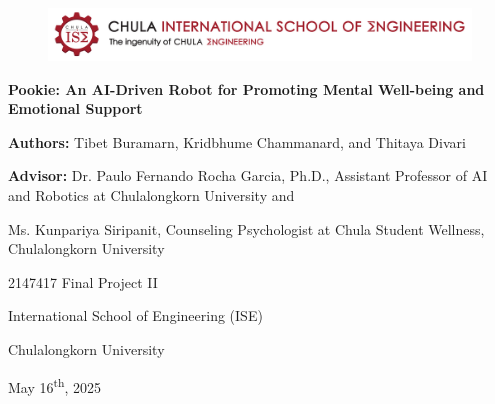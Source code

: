 \documentclass[a4paper,10pt]{article}
\begin{document}
\begin{titlepage}
    \centering  
    \begin{figure}[ht]
        \centering
        \includegraphics[width=\textwidth]{0-ise-logo.png}
    \end{figure}
    \vspace*{2cm} 
    
    {\Huge \textbf{Pookie: An AI-Driven Robot for Promoting Mental Well-being and Emotional Support} \par}
    \vspace{4cm}
    
    {\large \textbf{Authors:} Tibet Buramarn, Kridbhume Chammanard, and Thitaya Divari \par}
    \vspace{1cm}
    {\large \textbf{Advisor:} Dr. Paulo Fernando Rocha Garcia, Ph.D., Assistant Professor of AI and Robotics at Chulalongkorn University and \par}
    {\large Ms. Kunpariya Siripanit, Counseling Psychologist at Chula Student Wellness, Chulalongkorn University \par}

    \vspace{3cm}
    
    {\large 2147417 Final Project II \par}
    {\large International School of Engineering (ISE) \par}
    {\large Chulalongkorn University \par}
    
    \vspace{2cm}
    
    {\large May 16\textsuperscript{th}, 2025 \par}
    
    \vspace*{\fill}
\end{titlepage}

\thispagestyle{empty}
\end{document}
